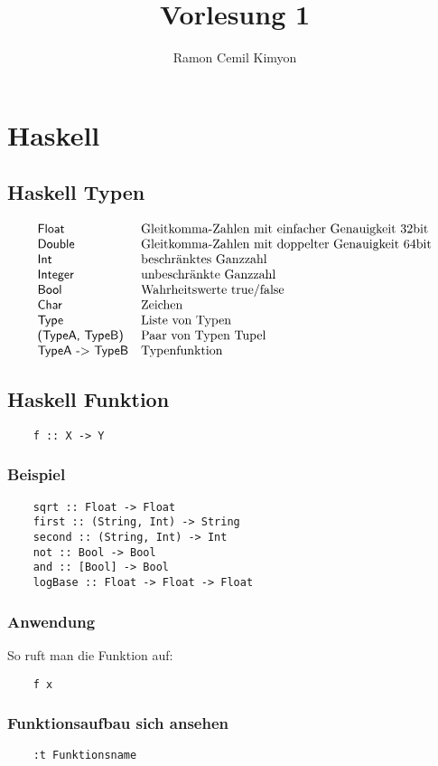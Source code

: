 \documentclass[a4paper]{article}
\title{Vorlesung 1}
\author{Ramon Cemil Kimyon}
\date{}
\begin{document}
\section{Haskell}
\subsection{Haskell Typen}
\[
\begin{array}{ll}
    \textsf{Float} & \textnormal{Gleitkomma-Zahlen mit einfacher Genauigkeit 32bit} \\
    \textsf{Double} & \textnormal{Gleitkomma-Zahlen mit doppelter Genauigkeit 64bit} \\
    \textsf{Int} & \textnormal{beschränktes Ganzzahl} \\
    \textsf{Integer} & \textnormal{unbeschränkte Ganzzahl} \\
    \textsf{Bool} & \textnormal{Wahrheitswerte true/false} \\
    \textsf{Char} & \textnormal{Zeichen} \\
    \textsf{Type} & \textnormal{Liste von Typen} \\
    \textsf{(TypeA, TypeB)} & \textnormal{Paar von Typen Tupel} \\
    \textsf{TypeA -> TypeB} & \textnormal{Typenfunktion}
\end{array}
\]
\subsection{Haskell Funktion}
\begin{verbatim}
    f :: X -> Y
\end{verbatim}
\subsubsection{Beispiel}
\begin{verbatim}
    sqrt :: Float -> Float
    first :: (String, Int) -> String
    second :: (String, Int) -> Int
    not :: Bool -> Bool
    and :: [Bool] -> Bool
    logBase :: Float -> Float -> Float
\end{verbatim}
\subsubsection{Anwendung}
So ruft man die Funktion auf:
\begin{verbatim}
    f x
\end{verbatim}
\subsubsection{Funktionsaufbau sich ansehen}
\begin{verbatim}
    :t Funktionsname
\end{verbatim}
\end{document}

